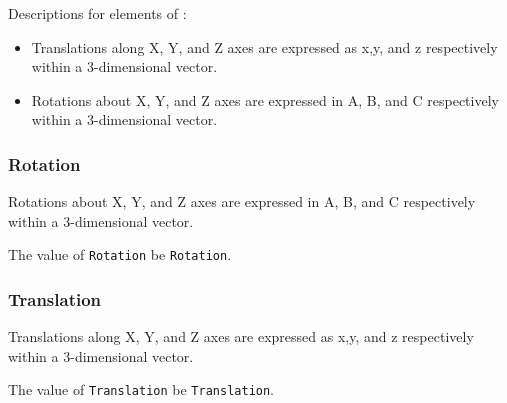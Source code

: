 Descriptions for elements of :

\begin{itemize}

\item {} \newline Translations along X, Y, and Z axes are expressed as x,y, and z respectively within a 3-dimensional vector. 

\item {} \newline Rotations about X, Y, and Z axes are expressed in A, B, and C respectively within a 3-dimensional vector. 

\end{itemize}



\subsubsection{Rotation}
\label{sec:Rotation}



Rotations about X, Y, and Z axes are expressed in A, B, and C respectively within a 3-dimensional vector. 



The value of \texttt{Rotation} \MUST be \texttt{Rotation}.



\subsubsection{Translation}
\label{sec:Translation}



Translations along X, Y, and Z axes are expressed as x,y, and z respectively within a 3-dimensional vector. 


The value of \texttt{Translation} \MUST be \texttt{Translation}.


